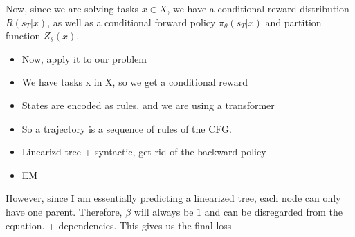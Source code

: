 Now, since we are solving tasks \( x \in X \), we have a conditional reward distribution $R(s_T|x)$, as well as a conditional forward policy $\pi_\theta(s_T|x)$ and partition function $Z_\theta(x)$.









\begin{itemize}
    \item Now, apply it to our problem
    \item We have tasks x in X, so we get a conditional reward
    \item States are encoded as rules, and we are using a transformer
    \item So a trajectory is a sequence of rules of the CFG. 
    \item Linearizd tree + syntactic, get rid of the backward policy
    \item EM
\end{itemize}










However, since I am essentially predicting a linearized tree, each node can only have one parent. Therefore, $\beta$ will always be $1$ and can be disregarded from the equation. + dependencies. This gives us the final loss 

